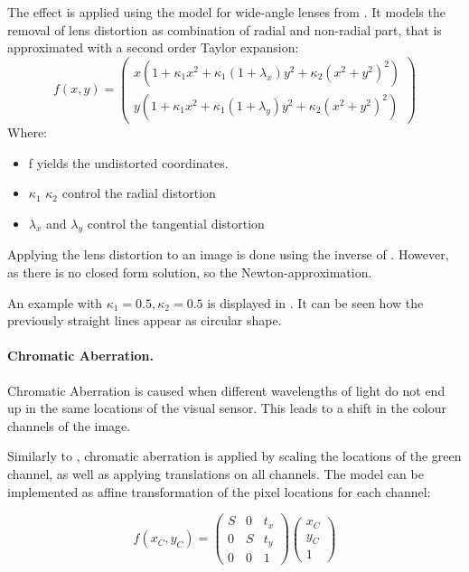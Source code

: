 The effect is applied using the model for wide-angle lenses from \cite{Vass}. It models the removal of lens distortion as combination of radial and non-radial part, that is approximated with a second order Taylor expansion:
\begin{equation}
f(x,y) =
\begin{pmatrix}
x (1 + \kappa_1 x^2 + \kappa_1 (1 + \lambda_x) y^2 + \kappa_2(x^2 + y^2)^2) \\
y (1 + \kappa_1 x^2 + \kappa_1 (1 + \lambda_y) y^2 + \kappa_2(x^2 + y^2)^2)
\end{pmatrix} 
\label{eq:distortion}
\end{equation}
Where:
\begin{itemize}
	\item f yields the undistorted coordinates.
	\item $\kappa_1$ $\kappa_2$ control the radial distortion 
	\item $\lambda_x$ and $\lambda_y$ control the tangential distortion
\end{itemize}

Applying the lens distortion to an image is done using the inverse of . However, as there is no closed form solution, so the Newton-approximation.

An example with $\kappa_1 = 0.5, \kappa_2 = 0.5$ is displayed in . It can be seen how the previously straight lines appear as circular shape.

\paragraph{Chromatic Aberration.}

Chromatic Aberration is caused when different wavelengths of light do not end up in the same locations of the visual sensor. This leads to a shift in the colour channels of the image.

Similarly to \cite{Carlson2018}, chromatic aberration is applied by scaling the locations of the green channel, as well as applying translations on all channels. The model can be implemented as affine transformation of the pixel locations for each channel:

\begin{equation}
f(x_C,y_C) = \begin{pmatrix}
S & 0 & t_x \\
0 & S & t_y \\
0 & 0 & 1
\end{pmatrix} \begin{pmatrix}
x_C \\
y_C \\
1
\end{pmatrix}
\end{equation}

